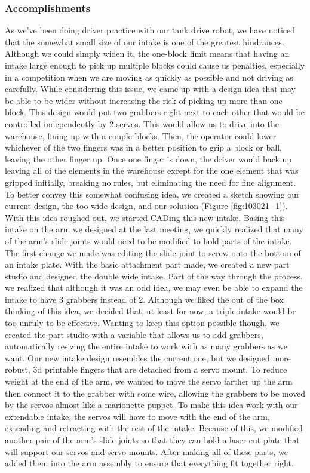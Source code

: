 \subsubsection*{Accomplishments}
As we’ve been doing driver practice with our tank drive robot, we have noticed that the somewhat small size of our intake is one of the greatest hindrances. Although we could simply widen it, the one-block limit means that having an intake large enough to pick up multiple blocks could cause us penalties, especially in a competition when we are moving as quickly as possible and not driving as carefully. While considering this issue, we came up with a design idea that may be able to be wider without increasing the risk of picking up more than one block. This design would put two grabbers right next to each other that would be controlled independently by 2 servos. This would allow us to drive into the warehouse, lining up with a couple blocks. Then, the operator could lower whichever of the two fingers was in a better position to grip a block or ball, leaving the other finger up. Once one finger is down, the driver would back up leaving all of the elements in the warehouse except for the one element that was gripped initially, breaking no rules, but eliminating the need for fine alignment. To better convey this somewhat confusing idea, we created a sketch showing our current design, the too wide design, and our solution (Figure \ref{fig:103021_1}). 
With this idea roughed out, we started CADing this new intake. Basing this intake on the arm we designed at the last meeting, we quickly realized that many of the arm’s slide joints would need to be modified to hold parts of the intake. The first change we made was editing the slide joint to screw onto the bottom of an intake plate. 
With the basic attachment part made, we created a new part studio and designed the double wide intake. Part of the way through the process, we realized that although it was an odd idea, we may even be able to expand the intake to have 3 grabbers instead of 2. Although we liked the out of the box thinking of this idea, we decided that, at least for now, a triple intake would be too unruly to be effective. Wanting to keep this option possible though, we created the part studio with a variable that allows us to add grabbers, automatically resizing the entire intake to work with as many grabbers as we want. Our new intake design resembles the current one, but we designed more robust, 3d printable fingers that are detached from a servo mount. To reduce weight at the end of the arm, we wanted to move the servo farther up the arm then connect it to the grabber with some wire, allowing the grabbers to be moved by the servos almost like a marionette puppet. To make this idea work with our extendable intake, the servos will have to move with the end of the arm, extending and retracting with the rest of the intake. Because of this, we modified another pair of the arm’s slide joints so that they can hold a laser cut plate that will support our servos and servo mounts. After making all of these parts, we added them into the arm assembly to ensure that everything fit together right.

